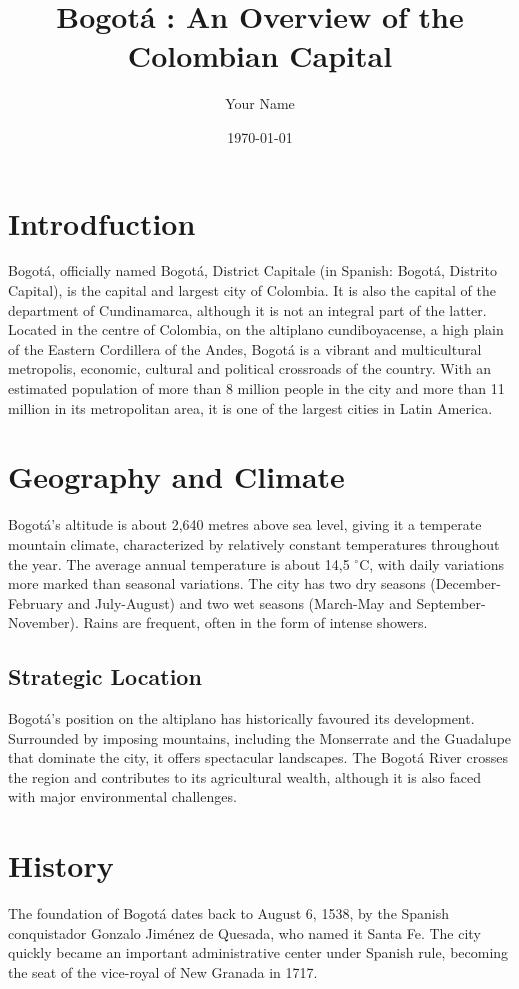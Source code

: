 \documentclass{article}
\title{Bogotá : An Overview of the Colombian Capital}
\author{Your Name}
\date{\today}
\begin{document}
\maketitle

\section{Introdfuction}
Bogotá, officially named Bogotá, District Capitale (in Spanish: Bogotá, Distrito Capital), is the capital and largest city of Colombia. It is also the capital of the department of Cundinamarca, although it is not an integral part of the latter. Located in the centre of Colombia, on the altiplano cundiboyacense, a high plain of the Eastern Cordillera of the Andes, Bogotá is a vibrant and multicultural metropolis, economic, cultural and political crossroads of the country. With an estimated population of more than 8 million people in the city and more than 11 million in its metropolitan area, it is one of the largest cities in Latin America.

\section{Geography and Climate}
Bogotá's altitude is about 2,640 metres above sea level, giving it a temperate mountain climate, characterized by relatively constant temperatures throughout the year. The average annual temperature is about 14,5 $^\circ$C, with daily variations more marked than seasonal variations. The city has two dry seasons (December-February and July-August) and two wet seasons (March-May and September-November). Rains are frequent, often in the form of intense showers.

\subsection{Strategic Location}
Bogotá's position on the altiplano has historically favoured its development. Surrounded by imposing mountains, including the Monserrate and the Guadalupe that dominate the city, it offers spectacular landscapes. The Bogotá River crosses the region and contributes to its agricultural wealth, although it is also faced with major environmental challenges.

\section{History}
The foundation of Bogotá dates back to August 6, 1538, by the Spanish conquistador Gonzalo Jiménez de Quesada, who named it Santa Fe. The city quickly became an important administrative center under Spanish rule, becoming the seat of the vice-royal of New Granada in 1717.
\end{document}
